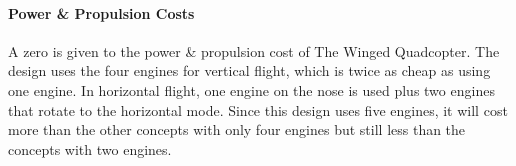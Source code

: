 \paragraph{Power \& Propulsion Costs}
A zero is given to the power \& propulsion cost of The Winged Quadcopter. The design uses the four engines for vertical flight, which is twice as cheap as using one engine. In horizontal flight, one engine on the nose is used plus two engines that rotate to the horizontal mode. Since this design uses five engines, it will cost more than the other concepts with only four engines but still less than the concepts with two engines.
